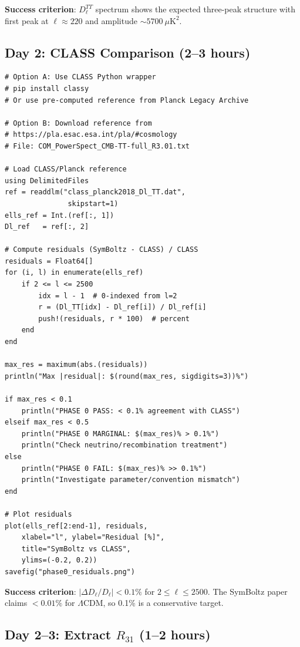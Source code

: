\documentclass[11pt,a4paper]{article}
\begin{document}
\textbf{Success criterion}: $D_\ell^{TT}$ spectrum shows the expected three-peak structure with first peak at $\ell \approx 220$ and amplitude $\sim 5700~\mu\mathrm{K}^2$.

\subsection{Day 2: CLASS Comparison (2--3 hours)}

\begin{lstlisting}[caption={CLASS reference and comparison}]
# Option A: Use CLASS Python wrapper
# pip install classy
# Or use pre-computed reference from Planck Legacy Archive

# Option B: Download reference from
# https://pla.esac.esa.int/pla/#cosmology
# File: COM_PowerSpect_CMB-TT-full_R3.01.txt

# Load CLASS/Planck reference
using DelimitedFiles
ref = readdlm("class_planck2018_Dl_TT.dat",
               skipstart=1)
ells_ref = Int.(ref[:, 1])
Dl_ref   = ref[:, 2]

# Compute residuals (SymBoltz - CLASS) / CLASS
residuals = Float64[]
for (i, l) in enumerate(ells_ref)
    if 2 <= l <= 2500
        idx = l - 1  # 0-indexed from l=2
        r = (Dl_TT[idx] - Dl_ref[i]) / Dl_ref[i]
        push!(residuals, r * 100)  # percent
    end
end

max_res = maximum(abs.(residuals))
println("Max |residual|: $(round(max_res, sigdigits=3))%")

if max_res < 0.1
    println("PHASE 0 PASS: < 0.1% agreement with CLASS")
elseif max_res < 0.5
    println("PHASE 0 MARGINAL: $(max_res)% > 0.1%")
    println("Check neutrino/recombination treatment")
else
    println("PHASE 0 FAIL: $(max_res)% >> 0.1%")
    println("Investigate parameter/convention mismatch")
end

# Plot residuals
plot(ells_ref[2:end-1], residuals,
    xlabel="l", ylabel="Residual [%]",
    title="SymBoltz vs CLASS",
    ylims=(-0.2, 0.2))
savefig("phase0_residuals.png")
\end{lstlisting}

\textbf{Success criterion}: $|\Delta D_\ell / D_\ell| < 0.1\%$ for $2 \leq \ell \leq 2500$. The SymBoltz paper claims $< 0.01\%$ for $\Lambda$CDM, so 0.1\% is a conservative target.

\subsection{Day 2--3: Extract $R_{31}$ (1--2 hours)}
\end{document}
